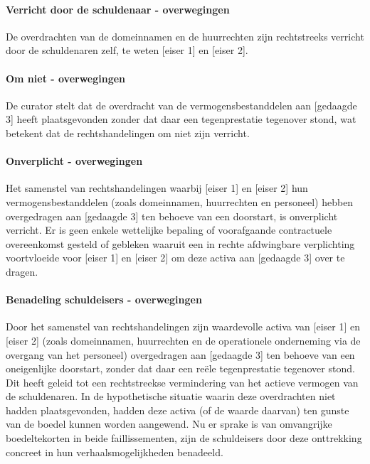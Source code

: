 \documentclass[
  dutch,
  a4paper,
]{article}
\begin{document}
\paragraph{Verricht door de schuldenaar - overwegingen}\label{verricht-door-de-schuldenaar---overwegingen-20}

De overdrachten van de domeinnamen en de huurrechten zijn rechtstreeks verricht door de schuldenaren zelf, te weten {[}eiser 1{]} en {[}eiser 2{]}.

\paragraph{Om niet - overwegingen}\label{om-niet---overwegingen-20}

De curator stelt dat de overdracht van de vermogensbestanddelen aan {[}gedaagde 3{]} heeft plaatsgevonden zonder dat daar een tegenprestatie tegenover stond, wat betekent dat de rechtshandelingen om niet zijn verricht.

\paragraph{Onverplicht - overwegingen}\label{onverplicht---overwegingen-20}

Het samenstel van rechtshandelingen waarbij {[}eiser 1{]} en {[}eiser 2{]} hun vermogensbestanddelen (zoals domeinnamen, huurrechten en personeel) hebben overgedragen aan {[}gedaagde 3{]} ten behoeve van een doorstart, is onverplicht verricht. Er is geen enkele wettelijke bepaling of voorafgaande contractuele overeenkomst gesteld of gebleken waaruit een in rechte afdwingbare verplichting voortvloeide voor {[}eiser 1{]} en {[}eiser 2{]} om deze activa aan {[}gedaagde 3{]} over te dragen.

\paragraph{Benadeling schuldeisers - overwegingen}\label{benadeling-schuldeisers---overwegingen-20}

Door het samenstel van rechtshandelingen zijn waardevolle activa van {[}eiser 1{]} en {[}eiser 2{]} (zoals domeinnamen, huurrechten en de operationele onderneming via de overgang van het personeel) overgedragen aan {[}gedaagde 3{]} ten behoeve van een oneigenlijke doorstart, zonder dat daar een reële tegenprestatie tegenover stond. Dit heeft geleid tot een rechtstreekse vermindering van het actieve vermogen van de schuldenaren. In de hypothetische situatie waarin deze overdrachten niet hadden plaatsgevonden, hadden deze activa (of de waarde daarvan) ten gunste van de boedel kunnen worden aangewend. Nu er sprake is van omvangrijke boedeltekorten in beide faillissementen, zijn de schuldeisers door deze onttrekking concreet in hun verhaalsmogelijkheden benadeeld.
\end{document}
